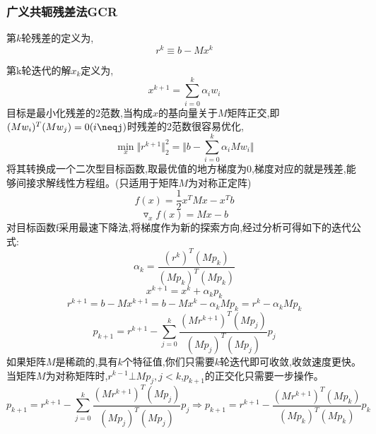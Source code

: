 \documentclass[12pt]{article}
\begin{document}
\begin{sloppypar}
\subsubsection{广义共轭残差法GCR}
\qquad 第$k$轮残差的定义为,
\begin{equation}
  r^k \equiv b - Mx^k
\end{equation}

\qquad 第k轮迭代的解$x_k$定义为,
\begin{equation}
  x^{k+1} = \sum_{i=0}^{k} \alpha_i w_i
\end{equation}
\qquad 目标是最小化残差的2范数,当构成$x$的基向量关于$M$矩阵正交,即$(Mw_i)^T(Mw_j)=0(i\neqj)$时残差的2范数很容易优化,
\begin{equation}
  \mathop{\min}_{x} \Vert r^{k+1} \Vert_2^2 = \Vert b - \sum_{i=0}^{k} \alpha_i M w_i \Vert
\end{equation}
\qquad 将其转换成一个二次型目标函数,取最优值的地方梯度为0,梯度对应的就是残差,能够间接求解线性方程组。(只适用于矩阵$M$为对称正定阵)
\begin{equation}
  f(x) = \frac{1}{2}x^TMx-x^Tb
\end{equation}
\begin{equation}
  \triangledown_xf(x) = Mx-b
\end{equation}
\qquad 对目标函数f采用最速下降法,将梯度作为新的探索方向,经过分析可得如下的迭代公式:
\begin{equation}  
  \alpha_k= \frac{\left(r^k\right)^T\left(M p_k\right)}{\left(M p_k\right)^T\left(M p_k\right)} 
\end{equation}
\begin{equation}
  x^{k+1} =x^k+\alpha_k p_k
\end{equation}
\begin{equation}
  r^{k+1} =b-M x^{k+1} =b-M x^k-\alpha_k M p_k =r^k-\alpha_k M p_k
\end{equation}
\begin{equation}
  p_{k+1} =r^{k+1}-\sum_{j=0}^k \frac{\left(M r^{k+1}\right)^T\left(M p_j\right)}{\left(M p_j\right)^T\left(M p_j\right)} p_j
\end{equation}
\qquad 如果矩阵$M$是稀疏的,具有$k$个特征值,你们只需要$k$轮迭代即可收敛,收敛速度更快。当矩阵$M$为对称矩阵时,$r^{k-1} \bot Mp_j,j<k$,$p_{k+1}$的正交化只需要一步操作。
\begin{equation}
  p_{k+1}=r^{k+1}-\sum_{j=0}^k \frac{\left(M r^{k+1}\right)^T\left(M p_j\right)}{\left(M p_j\right)^T\left(M p_j\right)} p_j \Rightarrow p_{k+1}=r^{k+1}-\frac{\left(M r^{k+1}\right)^T\left(M p_k\right)}{\left(M p_k\right)^T\left(M p_k\right)} p_k
\end{equation}


\end{sloppypar}
\end{document}

